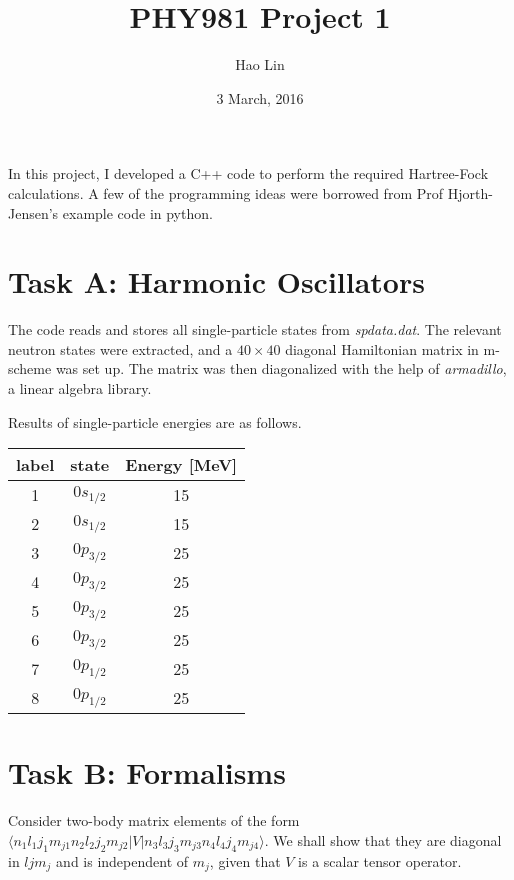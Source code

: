 \documentclass[11pt, oneside]{article}   	%
\title{PHY981 Project 1}
\author{Hao Lin}
\date{3 March, 2016}							%
\begin{document}
\maketitle

In this project, I developed a C++ code to perform the required Hartree-Fock calculations. A few of the programming ideas were borrowed from Prof Hjorth-Jensen's example code in python. 

\section{Task A: Harmonic Oscillators}
The code reads and stores all single-particle states from \textit{spdata.dat}. The relevant neutron states were extracted, and a $40\times40$ diagonal Hamiltonian matrix in m-scheme was set up. The matrix was then diagonalized with the help of \textit{armadillo}, a linear algebra library. 

Results of single-particle energies are as follows.
\begin{table}[H]
  \centering
\begin{tabular}{ccc}
  \toprule
	label & state &Energy [MeV] \\
  \midrule
	1 & $0s_{1/2}$ & 15 \\
	2 & $0s_{1/2}$ & 15 \\
	3 & $0p_{3/2}$ & 25 \\
	4 & $0p_{3/2}$ & 25 \\
	5 & $0p_{3/2}$ & 25 \\
	6 & $0p_{3/2}$ & 25 \\
	7 & $0p_{1/2}$ & 25 \\
	8 & $0p_{1/2}$ & 25 \\
    \bottomrule
  \end{tabular}
\end{table}

\section{Task B: Formalisms}
Consider two-body matrix elements of the form $\langle n_1 l_1 j_1 m_{j1} n_2 l_2 j_2 m_{j2}|V|n_3 l_3 j_3 m_{j3} n_4 l_4 j_4 m_{j4}\rangle$. We shall show that they are diagonal in $ljm_j$ and is independent of $m_j$, given that $V$ is a scalar tensor operator.
\end{document}
